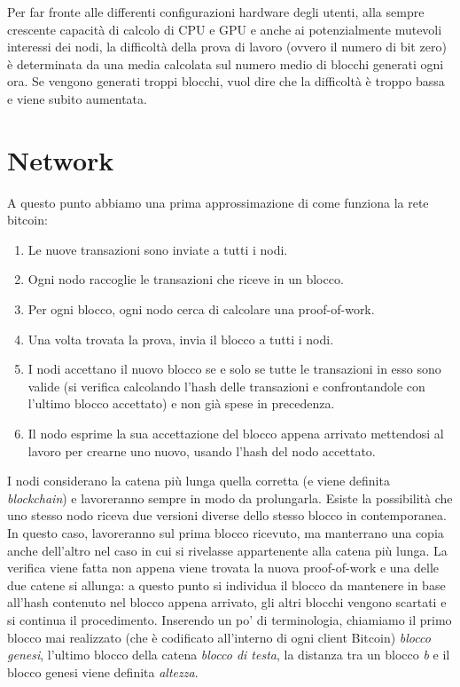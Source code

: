 Per far fronte alle differenti configurazioni hardware degli utenti, alla sempre crescente capacità di calcolo di CPU e GPU e anche ai potenzialmente mutevoli interessi dei nodi, la difficoltà della prova di lavoro (ovvero il numero di bit zero) è determinata da una media calcolata sul numero medio di blocchi generati ogni ora. Se vengono generati troppi blocchi, vuol dire che la difficoltà è troppo bassa e viene subito aumentata.

\section{Network}\label{network}

A questo punto abbiamo una prima approssimazione di come funziona la rete bitcoin:

\begin{enumerate}
\def\labelenumi{\arabic{enumi}.}
\itemsep1pt\parskip0pt
\item
  Le nuove transazioni sono inviate a tutti i nodi.
\item
  Ogni nodo raccoglie le transazioni che riceve in un blocco.
\item
  Per ogni blocco, ogni nodo cerca di calcolare una proof-of-work.
\item
  Una volta trovata la prova, invia il blocco a tutti i nodi.
\item
  I nodi accettano il nuovo blocco se e solo se tutte le transazioni in   esso sono valide (si verifica calcolando l'hash delle transazioni e   confrontandole con l'ultimo blocco accettato) e non già spese in   precedenza.
\item
  Il nodo esprime la sua accettazione del blocco appena arrivato   mettendosi al lavoro per crearne uno nuovo, usando l'hash del nodo   accettato.
\end{enumerate}

I nodi considerano la catena più lunga quella corretta (e viene definita \emph{blockchain}) e lavoreranno sempre in modo da prolungarla. Esiste la possibilità che uno stesso nodo riceva due versioni diverse dello stesso blocco in contemporanea. In questo caso, lavoreranno sul prima blocco ricevuto, ma manterrano una copia anche dell'altro nel caso in cui si rivelasse appartenente alla catena più lunga. La verifica viene fatta non appena viene trovata la nuova proof-of-work e una delle due catene si allunga: a questo punto si individua il blocco da mantenere in base all'hash contenuto nel blocco appena arrivato, gli altri blocchi vengono scartati e si continua il procedimento. Inserendo un po' di terminologia, chiamiamo il primo blocco mai realizzato (che è codificato all'interno di ogni client Bitcoin) \emph{blocco genesi}, l'ultimo blocco della catena \emph{blocco di testa}, la distanza tra un blocco \emph{b} e il blocco genesi viene definita \emph{altezza}.

